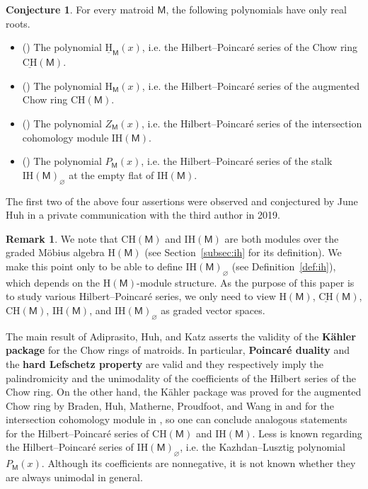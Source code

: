 \documentclass[11pt, a4paper, english]{amsart}
\theoremstyle{teoremas}
\theoremstyle{definition}
\newtheorem{conjecture}[theorem]{Conjecture}
\newtheorem{remark}[theorem]{Remark}
\newcommand{\M}{\mathsf{M}}
\renewcommand{\H}{\mathrm{H}}
\newcommand{\CH}{\mathrm{CH}}
\newcommand{\IH}{\mathrm{IH}}
\newcommand{\uH}{\underline{\mathrm{H}}}
\newcommand{\uCH}{\underline{\mathrm{CH}}}
\begin{document}
\begin{conjecture}\label{conj:real-rootedness}
    For every matroid $\M$, the following polynomials have only real roots.
    \begin{itemize}
        \item (\cite[Conjecture~8.18]{ferroni-schroter}) The polynomial $\uH_{\M}(x)$, i.e. the Hilbert--Poincar\'e series of the Chow ring $\uCH(\M)$.
        \item (\cite[Conjecture~4.3.3]{stevens-bachelor}) The polynomial $\H_{\M}(x)$, i.e. the Hilbert--Poincar\'e series of the augmented Chow ring $\CH(\M)$.
        \item (\cite[Conjecture~5.1] {proudfoot-xu-young})  The polynomial $Z_{\M}(x)$, i.e. the Hilbert--Poincar\'e series of the intersection cohomology module $\IH(\M)$.
        \item (\cite[Conjecture~3.2]{gedeon-proudfoot-young-survey})  The polynomial $P_{\M}(x)$, i.e. the Hilbert--Poincar\'e series of the stalk $\IH(\M)_{\varnothing}$ at the empty flat of $\IH(\M)$.
    \end{itemize}
\end{conjecture}

The first two of the above four assertions were observed and conjectured by June Huh in a private communication with the third author in 2019.  

\begin{remark}
    We note that $\CH(\M)$ and $\IH(\M)$ are both modules over the graded M\"obius algebra $\H(\M)$ (see Section~\ref{subsec:ih} for its definition).  We make this point only to be able to define $\IH(\M)_\varnothing$ (see Definition~\ref{def:ih}), which depends on the $\H(\M)$-module structure.  As the purpose of this paper is to study various Hilbert--Poincar\'e series, we only need to view $\H(\M)$, $\uCH(\M)$, $\CH(\M)$, $\IH(\M)$, and $\IH(\M)_\varnothing$ as graded vector spaces.
\end{remark}

The main result of Adiprasito, Huh, and Katz \cite[Theorem~1.4]{adiprasito-huh-katz} asserts the validity of the \textbf{K\"ahler package} for the Chow rings of matroids. In particular, \textbf{Poincar\'e duality} and the \textbf{hard Lefschetz property} are valid and they respectively imply the palindromicity and the unimodality of the coefficients of the Hilbert series of the Chow ring. On the other hand, the K\"ahler package was proved for the augmented Chow ring by Braden, Huh, Matherne, Proudfoot, and Wang in \cite[Theorem~1.6]{semismall} and for the intersection cohomology module in \cite[Theorem~1.6]{braden-huh-matherne-proudfoot-wang}, so one can conclude analogous statements for the Hilbert--Poincar\'e series of $\CH(\M)$ and $\IH(\M)$. Less is known regarding the Hilbert--Poincar\'e series of $\IH(\M)_{\varnothing}$, i.e. the Kazhdan--Lusztig polynomial $P_{\M}(x)$. Although its coefficients are nonnegative, it is not known whether they are always unimodal in general.
\end{document}
